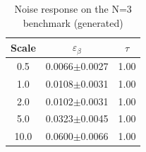 \begin{table}[h]
\small
\centering
\caption{Noise response on the N=3 benchmark (generated)}
\label{tab:noise}
\begin{tabular}{ccc}
\hline
Scale&$\varepsilon_\beta$&$\tau$\\
\hline
0.5&0.0066$\pm$0.0027&1.00\\
1.0&0.0108$\pm$0.0031&1.00\\
2.0&0.0102$\pm$0.0031&1.00\\
5.0&0.0323$\pm$0.0045&1.00\\
10.0&0.0600$\pm$0.0066&1.00\\
\hline
\end{tabular}
\end{table}
